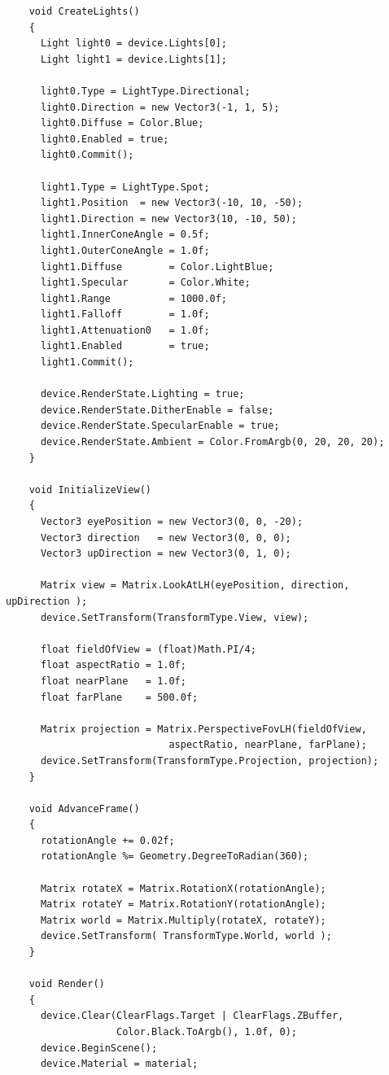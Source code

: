 \begin{scriptsize}
\begin{verbatim}
    void CreateLights() 
    {
      Light light0 = device.Lights[0];
      Light light1 = device.Lights[1];

      light0.Type = LightType.Directional;
      light0.Direction = new Vector3(-1, 1, 5);
      light0.Diffuse = Color.Blue;
      light0.Enabled = true;
      light0.Commit();

      light1.Type = LightType.Spot;
      light1.Position  = new Vector3(-10, 10, -50);
      light1.Direction = new Vector3(10, -10, 50);
      light1.InnerConeAngle = 0.5f;
      light1.OuterConeAngle = 1.0f;
      light1.Diffuse        = Color.LightBlue;
      light1.Specular       = Color.White;
      light1.Range          = 1000.0f;
      light1.Falloff        = 1.0f;
      light1.Attenuation0   = 1.0f;
      light1.Enabled        = true;
      light1.Commit();

      device.RenderState.Lighting = true;
      device.RenderState.DitherEnable = false;
      device.RenderState.SpecularEnable = true;
      device.RenderState.Ambient = Color.FromArgb(0, 20, 20, 20);
    }

    void InitializeView() 
    {
      Vector3 eyePosition = new Vector3(0, 0, -20);
      Vector3 direction   = new Vector3(0, 0, 0);
      Vector3 upDirection = new Vector3(0, 1, 0);

      Matrix view = Matrix.LookAtLH(eyePosition, direction, upDirection );
      device.SetTransform(TransformType.View, view);

      float fieldOfView = (float)Math.PI/4;
      float aspectRatio = 1.0f;
      float nearPlane   = 1.0f;
      float farPlane    = 500.0f;

      Matrix projection = Matrix.PerspectiveFovLH(fieldOfView, 
                            aspectRatio, nearPlane, farPlane);
      device.SetTransform(TransformType.Projection, projection);
    }

    void AdvanceFrame() 
    {
      rotationAngle += 0.02f;
      rotationAngle %= Geometry.DegreeToRadian(360);

      Matrix rotateX = Matrix.RotationX(rotationAngle);
      Matrix rotateY = Matrix.RotationY(rotationAngle);
      Matrix world = Matrix.Multiply(rotateX, rotateY);
      device.SetTransform( TransformType.World, world );
    }

    void Render() 
    {
      device.Clear(ClearFlags.Target | ClearFlags.ZBuffer, 
                   Color.Black.ToArgb(), 1.0f, 0);
      device.BeginScene();
      device.Material = material;


\end{verbatim}
\end{scriptsize}
